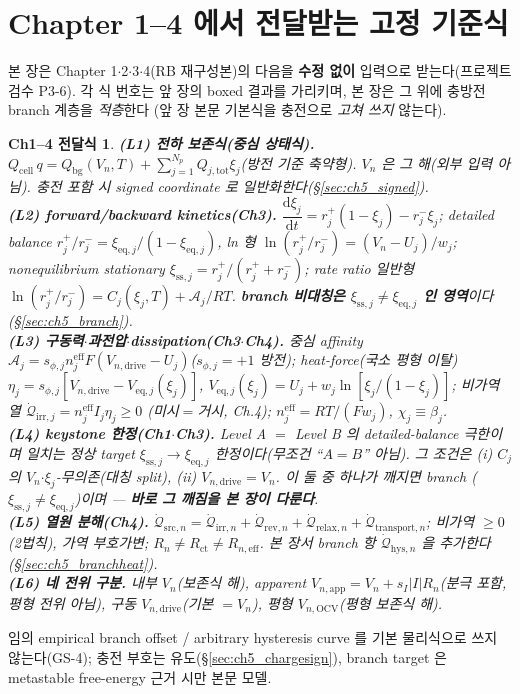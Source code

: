 \documentclass[11pt,a4paper]{article}
\newtheorem*{linkbox}{Ch1--4 전달식}
\newcommand{\dd}{\mathrm{d}}
\newcommand{\eff}{\mathrm{eff}}
\newcommand{\eq}{\mathrm{eq}}
\newcommand{\app}{\mathrm{app}}
\newcommand{\drive}{\mathrm{drive}}
\newcommand{\bg}{\mathrm{bg}}
\newcommand{\cell}{\mathrm{cell}}
\newcommand{\OCV}{\mathrm{OCV}}
\newcommand{\tot}{\mathrm{tot}}
\newcommand{\irr}{\mathrm{irr}}
\newcommand{\rev}{\mathrm{rev}}
\newcommand{\src}{\mathrm{src}}
\newcommand{\rlx}{\mathrm{relax}}
\newcommand{\ct}{\mathrm{ct}}
\newcommand{\transp}{\mathrm{transport}}
\newcommand{\hys}{\mathrm{hys}}
\newcommand{\sstat}{\mathrm{ss}}
\begin{document}
\section{Chapter 1--4 에서 전달받는 고정 기준식}\label{sec:ch5_inherit}
본 장은 Chapter 1$\cdot$2$\cdot$3$\cdot$4(RB 재구성본)의 다음을 \textbf{수정 없이} 입력으로 받는다(프로젝트
검수 P3-6). 각 식 번호는 앞 장의 boxed 결과를 가리키며, 본 장은 그 위에 충방전 branch 계층을 \emph{적층}한다
(앞 장 본문 기본식을 충전으로 \emph{고쳐 쓰지} 않는다).
\begin{linkbox}
\textbf{(L1) 전하 보존식(중심 상태식).} $Q_\cell\,q=Q_\bg(V_n,T)+\sum_{j=1}^{N_p}Q_{j,\tot}\xi_j$(방전 기준
축약형). $V_n$ 은 그 해(외부 입력 아님). 충전 포함 시 signed coordinate 로 일반화한다(\S\ref{sec:ch5_signed}).\\
\textbf{(L2) forward/backward kinetics(Ch3).} $\dfrac{\dd\xi_j}{\dd t}=r_j^+(1-\xi_j)-r_j^-\xi_j$; detailed
balance $r_j^+/r_j^-=\xi_{\eq,j}/(1-\xi_{\eq,j})$, ln 형 $\ln(r_j^+/r_j^-)=(V_n-U_j)/w_j$; nonequilibrium
stationary $\xi_{\sstat,j}=r_j^+/(r_j^++r_j^-)$; rate ratio 일반형 $\ln(r_j^+/r_j^-)=C_j(\xi_j,T)+\mathcal A_j/RT$.
\textbf{branch 비대칭은 $\xi_{\sstat,j}\ne\xi_{\eq,j}$ 인 영역}이다(\S\ref{sec:ch5_branch}).\\
\textbf{(L3) 구동력$\cdot$과전압$\cdot$dissipation(Ch3$\cdot$Ch4).} 중심 affinity $\mathcal A_j=s_{\phi,j}n_j^{\eff}
F(V_{n,\drive}-U_j)$($s_{\phi,j}=+1$ 방전); heat-force(국소 평형 이탈) $\eta_j=s_{\phi,j}[V_{n,\drive}-V_{\eq,j}(\xi_j)]$,
$V_{\eq,j}(\xi_j)=U_j+w_j\ln[\xi_j/(1-\xi_j)]$; 비가역 열 $\dot{\mathcal Q}_{\irr,j}=n_j^{\eff}I_j\eta_j\ge0$
(미시$=$거시, Ch.4); $n_j^{\eff}=RT/(Fw_j)$, $\chi_j\equiv\beta_j$.\\
\textbf{(L4) keystone 한정(Ch1$\cdot$Ch3).} Level A $=$ Level B 의 detailed-balance \emph{극한}이며 일치는
\emph{정상 target} $\xi_{\sstat,j}\to\xi_{\eq,j}$ \emph{한정}이다(무조건 ``$A=B$'' 아님). 그 조건은 (i) $C_j$
의 $V_n$$\cdot$$\xi_j$-무의존(대칭 split), (ii) $V_{n,\drive}=V_n$. \emph{이 둘 중 하나가 깨지면 branch}
($\xi_{\sstat,j}\ne\xi_{\eq,j}$)이며 — \textbf{바로 그 깨짐을 본 장이 다룬다}.\\
\textbf{(L5) 열원 분해(Ch4).} $\dot{\mathcal Q}_{\src,n}=\dot{\mathcal Q}_{\irr,n}+\dot{\mathcal Q}_{\rev,n}
+\dot{\mathcal Q}_{\rlx,n}+\dot{\mathcal Q}_{\transp,n}$; 비가역 $\ge0$(2법칙), 가역 부호가변; $R_n\ne R_\ct\ne R_{n,\eff}$.
본 장서 branch 항 $\dot{\mathcal Q}_{\hys,n}$ 을 추가한다(\S\ref{sec:ch5_branchheat}).\\
\textbf{(L6) 네 전위 구분.} 내부 $V_n$(보존식 해), apparent $V_{n,\app}=V_n+s_I|I|R_n$(분극 포함, 평형 전위
아님), 구동 $V_{n,\drive}$(기본 $=V_n$), 평형 $V_{n,\OCV}$(평형 보존식 해).
\end{linkbox}
임의 empirical branch offset / arbitrary hysteresis curve 를 기본 물리식으로 쓰지 않는다(GS-4); 충전 부호는
유도(\S\ref{sec:ch5_chargesign}), branch target 은 metastable free-energy 근거 시만 본문 모델.
\end{document}
